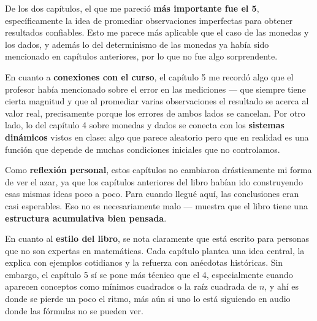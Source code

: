 \begin{respuesta}[title=Crítica — Fancho]

De los dos capítulos, el que me pareció \textbf{más importante fue el 5},
específicamente la idea de promediar observaciones imperfectas para obtener resultados
confiables. Esto me parece más aplicable que el caso de las monedas y los dados, y
además lo del determinismo de las monedas ya había sido mencionado en capítulos
anteriores, por lo que no fue algo sorprendente.

\medskip

En cuanto a \textbf{conexiones con el curso}, el capítulo 5 me recordó algo que el
profesor había mencionado sobre el error en las mediciones — que siempre tiene cierta
magnitud y que al promediar varias observaciones el resultado se acerca al valor real,
precisamente porque los errores de ambos lados se cancelan. Por otro lado, lo del
capítulo 4 sobre monedas y dados se conecta con los \textbf{sistemas dinámicos} vistos
en clase: algo que parece aleatorio pero que en realidad es una función que depende de
muchas condiciones iniciales que no controlamos.

\medskip

Como \textbf{reflexión personal}, estos capítulos no cambiaron drásticamente mi forma
de ver el azar, ya que los capítulos anteriores del libro habían ido construyendo esas
mismas ideas poco a poco. Para cuando llegué aquí, las conclusiones eran casi
esperables. Eso no es necesariamente malo — muestra que el libro tiene una
\textbf{estructura acumulativa bien pensada}.

\medskip

En cuanto al \textbf{estilo del libro}, se nota claramente que está escrito para
personas que no son expertas en matemáticas. Cada capítulo plantea una idea central,
la explica con ejemplos cotidianos y la refuerza con anécdotas históricas. Sin embargo,
el capítulo 5 sí se pone más técnico que el 4, especialmente cuando aparecen conceptos
como mínimos cuadrados o la raíz cuadrada de $n$, y ahí es donde se pierde un poco el
ritmo, más aún si uno lo está siguiendo en audio donde las fórmulas no se pueden ver.

\end{respuesta}

\newpage
